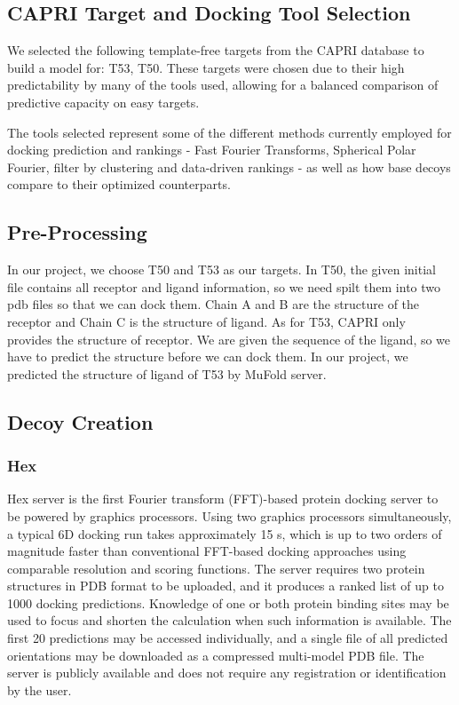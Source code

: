 \documentclass{article}
\begin{document}
\subsection{CAPRI Target and Docking Tool Selection}

We selected the following template-free targets from the CAPRI database to build a model for: T53, T50. These targets were chosen due to their high predictability by many of the tools used, allowing for a balanced comparison of predictive capacity on easy targets.

The tools selected represent some of the different methods currently employed for docking prediction and rankings - Fast Fourier Transforms, Spherical Polar Fourier, filter by clustering and data-driven rankings - as well as how base decoys compare to their optimized counterparts. 

\subsection{Pre-Processing}

In our project, we choose T50 and T53 as our targets. In T50, the given initial file contains all receptor and ligand information, so we need spilt them into two pdb files so that we can dock them. Chain A and B are the structure of the receptor and Chain C is the structure of ligand. As for T53, CAPRI only provides the structure of receptor. We are given the sequence of the ligand, so we have to predict the structure before we can dock them. In our project, we predicted the structure of ligand of T53 by MuFold server. 


\subsection{Decoy Creation}



\subsubsection{Hex}

    Hex server is the first Fourier transform (FFT)-based protein docking server to be powered by graphics processors. Using two graphics processors simultaneously, a typical 6D docking run takes approximately 15 s, which is up to two orders of magnitude faster than conventional FFT-based docking approaches using comparable resolution and scoring functions. The server requires two protein structures in PDB format to be uploaded, and it produces a ranked list of up to 1000 docking predictions. Knowledge of one or both protein binding sites may be used to focus and shorten the calculation when such information is available. The first 20 predictions may be accessed individually, and a single file of all predicted orientations may be downloaded as a compressed multi-model PDB file. The server is publicly available and does not require any registration or identification by the user.
\end{document}
